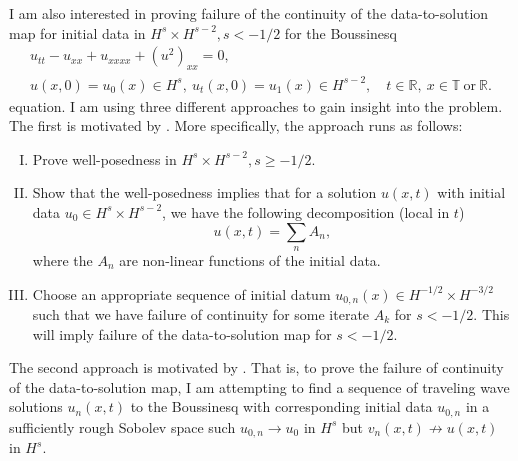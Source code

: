\documentclass[12pt,reqno]{amsart}
\newcommand{\rr}{\mathbb{R}}
\newcommand{\ci}{\mathbb{T}}
\begin{document}
I am also interested in proving failure of the continuity of the data-to-solution map for
initial data in $H^{s} \times H^{s-2}, s < -1/2$ for the Boussinesq 
\begin{gather}
   u_{tt} - u_{xx} + u_{xxxx} + (u^{2})_{xx} = 0,
  \\
   u(x,0) = u_{0}(x) \in H^{s}, \  u_{t}(x,0) = u_{1}(x) \in H^{s-2},
  \quad t \in \rr, \ x \in \ci \ \text{or} \ \rr.
\end{gather} 
equation. I am using three
different approaches to gain insight into the problem. The first is motivated by
\cite{Bejenaru-Tao-2006-Sharp-well-posedness-and-ill-posedness}. More
specifically, the approach runs as follows:
\begin{enumerate}[I.]
  \item
    Prove well-posedness in $H^{s} \times H^{s-2}, s \ge -1/2$.
 \item
   Show that the well-posedness implies that for a solution $u(x,t)$ with
   initial data $u_{0} \in H^{s} \times H^{s-2}$, we have the following
   decomposition (local in $t$) 
   $$u(x,t) = \sum_{n} A_{n},$$ where the $A_{n}$ are non-linear functions of
   the initial data. 
 \item 
   Choose an appropriate sequence of initial datum $u_{0,n}(x) \in H^{-1/2}
   \times H^{-3/2}$ such that
   we have failure of continuity for some iterate $A_{k}$ for $s < -1/2$.
   This will imply
   failure of the data-to-solution map for $s < -1/2$.
   \end{enumerate}
%
The second approach is motivated by \cite{Himonas:2005kx}. That is,
to prove the failure of continuity of the data-to-solution map, I am attempting
to find a sequence of traveling wave solutions $u_{n}(x,t)$ to the Boussinesq with
corresponding initial data $u_{0,n}$ in a sufficiently rough Sobolev space such 
$u_{0,n} \to u_{0}$ in $H^{s}$ but $v_{n}(x,t) \not \to u(x,t)$ in $H^{s}$. 
\end{document}
